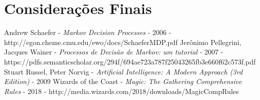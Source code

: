 \documentclass[dvipsnames]{book}
\begin{document}
\chapter{Considerações Finais}

\begin{thebibliography}{1}
  Andrew Schaefer - {\em Markov Decision Processes} - 2006 - http://egon.cheme.cmu.edu/ewo/docs/SchaeferMDP.pdf
  Jerônimo Pellegrini, Jacques Wainer - {\em Processos de Decisão de Markov: um tutorial} - 2007 - https://pdfs.semanticscholar.org/294f/694ae723a787f25043265fb3e660f62c573f.pdf
  Stuart Russel, Peter Norvig - {\em Artificial Intelligence: A Modern Approach (3rd Edition)} - 2009
  Wizards of the Coast - {\em Magic: The Gathering Comprehensive Rules} - 2018 - http://media.wizards.com/2018/downloads/MagicCompRules%
\end{thebibliography}
\end{document}
